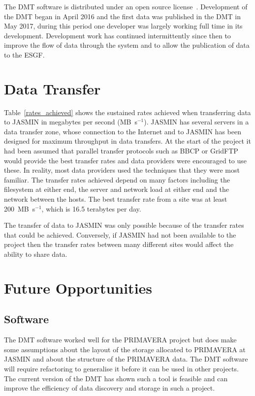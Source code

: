 \documentclass[gmd, manuscript]{copernicus}
\begin{document}
The DMT software is distributed under an open source license~\cite{Seddon2019}. Development of the DMT began in April 2016 and the first data was published in the DMT in May 2017, during this period one developer was largely working full time in its development. Development work has continued intermittently since then to improve the flow of data through the system and to allow the publication of data to the ESGF. 

\section{Data Transfer}

Table~\ref{rates_achieved} shows the sustained rates achieved when transferring data to JASMIN in megabytes per second (MB~s$^{-1}$). JASMIN has several servers in a data transfer zone, whose connection to the Internet and to JASMIN has been designed for maximum throughput in data transfers. At the start of the project it had been assumed that parallel transfer protocols such as BBCP or GridFTP would provide the best transfer rates and data providers were encouraged to use these. In reality, most data providers used the techniques that they were most familiar. The transfer rates achieved depend on many factors including the filesystem at either end, the server and network load at either end and the network between the hosts. The best transfer rate from a site was at least 200~MB~s$^{-1}$, which is 16.5 terabytes per day. 

The transfer of data to JASMIN was only possible because of the transfer rates that could be achieved. Conversely, if JASMIN had not been available to the project then the transfer rates between many different sites would affect the ability to share data.


\section{Future Opportunities}

\subsection{Software}

The DMT software worked well for the PRIMAVERA project but does make some assumptions about the layout of the storage allocated to PRIMAVERA at JASMIN and about the structure of the PRIMAVERA data. The DMT software will require refactoring to generalise it before it can be used in other projects. The current version of the DMT has shown such a tool is feasible and can improve the efficiency of data discovery and storage in such a project.
\end{document}
